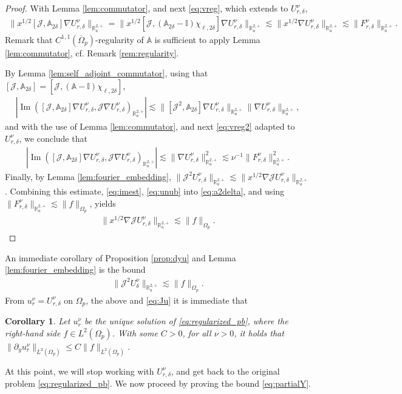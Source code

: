 \documentclass[report]{elsarticle}
\newtheorem{corollary}[theorem]{Corollary}
\numberwithin{theorem}{section}
\renewcommand{\Im}{\operatorname{Im}}
\begin{document}
\begin{proof}
With Lemma \ref{lem:commutator}, and next \eqref{eq:vreg}, which extends to $U^{\nu}_{r,\delta}$, 
\begin{align}
	\label{eq:unub}
	\|x^{1/2}[\mathcal{J},\mathbb{A}_{2\delta}]\nabla U^{\nu}_{r,\delta}\|_{\mathbb{R}^{2,+}_a}=	\|x^{1/2}[\mathcal{J},(\mathbb{A}_{2\delta}-\mathbb{I})\chi_{\ell,2\delta}]\nabla U^{\nu}_{r,\delta}\|_{\mathbb{R}^{2,+}_a}\lesssim \|x^{1/2}\nabla U^{\nu}_{r,\delta}\|_{\mathbb{R}^{2,+}_a}\lesssim \|F^{\nu}_{r,\delta}\|_{\mathbb{R}^{2,+}_a}.
\end{align}
Remark that $C^{1,1}(\overline{\Omega}_p)$-regularity of $\mathbb{A}$ is sufficient to apply Lemma \ref{lem:commutator}, cf. Remark \ref{rem:regularity}. 

By Lemma \ref{lem:self_adjoint_commutator}, using that $[\mathcal{J}, \mathbb{A}_{2\delta}]=[\mathcal{J}, (\mathbb{A}-\mathbb{I})\chi_{\ell,2\delta}]$, 
\begin{align*}
|\Im ([\mathcal{J}, \mathbb{A}_{2\delta}]\nabla U^{\nu}_{r,\delta}, \mathcal{J}\nabla U^{\nu}_{r,\delta})_{\mathbb{R}^{2,+}_a}|\lesssim \|[\mathcal{J}^2, \mathbb{A}_{2\delta}]\nabla U^{\nu}_{r,\delta}\|_{\mathbb{R}^{2,+}_a}\|\nabla U^{\nu}_{r,\delta}\|_{\mathbb{R}^{2,+}_a},
\end{align*} 
and with the use of Lemma \ref{lem:commutator}, and next \eqref{eq:vreg2} adapted to $U^{\nu}_{r,\delta}$, we conclude that 
\begin{align}
	\label{eq:imest}
|\Im ([\mathcal{J}, \mathbb{A}_{2\delta}]\nabla U^{\nu}_{r,\delta}, \mathcal{J}\nabla U^{\nu}_{r,\delta})_{\mathbb{R}^{2,+}_a}|\lesssim \|\nabla U^{\nu}_{r,\delta}\|_{\mathbb{R}^{2,+}_a}^2\lesssim \nu^{-1}\|F^{\nu}_{r,\delta}\|_{\mathbb{R}^{2,+}_a}^2.
\end{align}
Finally, by Lemma \ref{lem:fourier_embedding}, $\|\mathcal{J}^2 U^{\nu}_{r,\delta}\|_{\mathbb{R}^{2,+}_a}\lesssim \|x^{1/2}\nabla\mathcal{J}U^{\nu}_{r,\delta}\|_{\mathbb{R}^{2,+}_a}$. Combining this estimate, \eqref{eq:imest}, \eqref{eq:unub} into \eqref{eq:a2delta}, and using $\|F^{\nu}_{r,\delta}\|_{\mathbb{R}^{2,+}_a}\lesssim \|f\|_{\Omega_p}$, yields 
\begin{align*}
	\|x^{1/2}\nabla \mathcal{J}U^{\nu}_{r,\delta}\|_{\mathbb{R}^{2,+}_a}\lesssim \|f\|_{\Omega_p}.
\end{align*}
\end{proof}
An immediate corollary of Proposition \ref{prop:dyu} and Lemma \ref{lem:fourier_embedding} is the bound 
\begin{align*}
	\|\mathcal{J}^2U^{\nu}_{\delta}\|_{\mathbb{R}^{2,+}_a}\lesssim \|f\|_{\Omega_p}.
\end{align*}
From $u^{\nu}_r=U^{\nu}_{r,\delta}$ on $\Omega_p$, the above and \eqref{eq:Ju} it is immediate that 
\begin{corollary}
	\label{cor:dyu}
	Let  $u^{\nu}_r$ be the unique solution of \eqref{eq:regularized_pb}, where the right-hand side $f\in L^2(\Omega_p)$. With some $C>0$, for all $\nu>0$, it holds that $\|\partial_y u^{\nu}_r\|_{L^2(\Omega_p)}\leq C\|f\|_{L^2(\Omega_p)}$. 	
\end{corollary}
At this point, we will stop working with $U^{\nu}_{r,\delta}$, and get back to the original problem \eqref{eq:regularized_pb}. 
We now proceed by proving the bound \eqref{eq:partialY}. 
\end{document}
